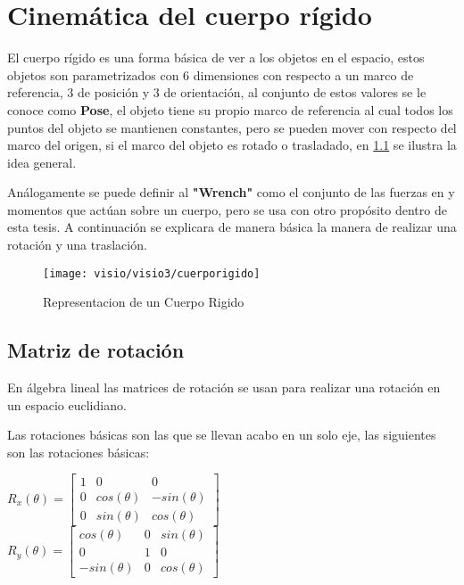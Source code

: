 \chapter{Cinemática del cuerpo rígido} \label{cinematica}
El cuerpo rígido es una forma básica de ver a los objetos en el espacio, estos objetos son parametrizados con 6 dimensiones con respecto a un marco de referencia, 3 de posición y 3 de orientación, al conjunto de estos valores se le conoce como \textbf{Pose}, el objeto tiene su propio marco de referencia al cual todos los puntos del objeto se mantienen constantes, pero se pueden mover con respecto del marco del origen, si el marco del objeto es rotado o trasladado, en \cref{fig:cuerporigido} se ilustra la idea general.

Análogamente se puede definir al \textbf{"Wrench"} como el conjunto de las fuerzas en y momentos que actúan sobre un cuerpo, pero se usa con otro propósito dentro de esta tesis.
A continuación se explicara de manera básica la manera de realizar una rotación y una traslación.

\begin{figure}[h]
	\centering
	\texttt{[image: visio/visio3/cuerporigido]}
	\caption{Representacion de un Cuerpo Rigido}
	\label{fig:cuerporigido}
\end{figure}

\section{Matriz de rotación}

En álgebra lineal las matrices de rotación se usan para realizar una rotación en un espacio euclidiano.

Las rotaciones básicas son las que se llevan acabo en un solo eje, las siguientes son las rotaciones básicas:

$R_x(\theta)=\begin{bmatrix}
1	& 0 &0  \\ 
0	&  cos(\theta)& -sin(\theta) \\ 
0	& sin(\theta) & cos(\theta) 
\end{bmatrix}$\\

$R_y(\theta)=\begin{bmatrix}
	cos(\theta)	& 0 & sin(\theta)  \\ 
	0	&  1 & 0 \\ 
	-sin(\theta)	& 0 & cos(\theta) 
\end{bmatrix}$\\

